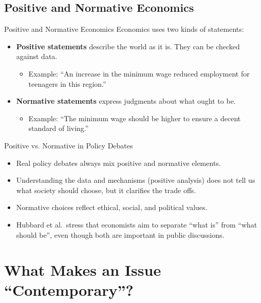 \documentclass[aspectratio=169]{beamer}
\begin{document}
\subsection{Positive and Normative Economics}

\begin{frame}{Positive and Normative Economics}
  \transfade
  Economics uses two kinds of statements:

  \vspace{0.2cm}
  \begin{itemize}
    \item \textbf{Positive statements} describe the world as it is. They can be checked against data.
          \begin{itemize}
            \item Example: ``An increase in the minimum wage reduced employment for teenagers in
            this region.''
          \end{itemize}
    \item \textbf{Normative statements} express judgments about what ought to be.
          \begin{itemize}
            \item Example: ``The minimum wage should be higher to ensure a decent standard of living.''
          \end{itemize}
  \end{itemize}
\end{frame}

\begin{frame}{Positive vs. Normative in Policy Debates}
  \transfade
  \begin{itemize}
    \item Real policy debates always mix positive and normative elements.
    \item Understanding the data and mechanisms (positive analysis) does not tell us what society
    should choose, but it clarifies the trade offs.
    \item Normative choices reflect ethical, social, and political values.
    \item Hubbard et al.\ stress that economists aim to separate ``what is'' from ``what should be'', even
    though both are important in public discussions.
  \end{itemize}
\end{frame}

\section{What Makes an Issue ``Contemporary''?}
\end{document}
